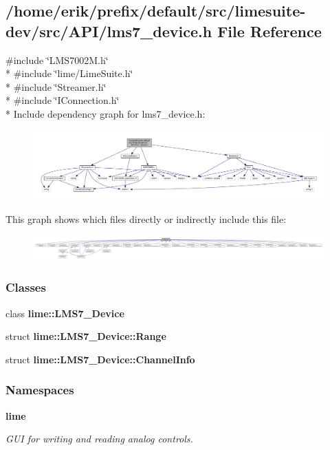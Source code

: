 \subsection{/home/erik/prefix/default/src/limesuite-\/dev/src/\+A\+P\+I/lms7\+\_\+device.h File Reference}
\label{lms7__device_8h}
{\ttfamily \#include \char`\"{}L\+M\+S7002\+M.\+h\char`\"{}}\\*
{\ttfamily \#include \char`\"{}lime/\+Lime\+Suite.\+h\char`\"{}}\\*
{\ttfamily \#include \char`\"{}Streamer.\+h\char`\"{}}\\*
{\ttfamily \#include \char`\"{}I\+Connection.\+h\char`\"{}}\\*
Include dependency graph for lms7\+\_\+device.\+h\+:
\nopagebreak
\begin{figure}[H]
\begin{center}
\leavevmode
\includegraphics[width=350pt]{d6/de3/lms7__device_8h__incl}
\end{center}
\end{figure}
This graph shows which files directly or indirectly include this file\+:
\nopagebreak
\begin{figure}[H]
\begin{center}
\leavevmode
\includegraphics[width=350pt]{d0/d32/lms7__device_8h__dep__incl}
\end{center}
\end{figure}
\subsubsection*{Classes}
\begin{DoxyCompactItemize}
\item 
class {\bf lime\+::\+L\+M\+S7\+\_\+\+Device}
\item 
struct {\bf lime\+::\+L\+M\+S7\+\_\+\+Device\+::\+Range}
\item 
struct {\bf lime\+::\+L\+M\+S7\+\_\+\+Device\+::\+Channel\+Info}
\end{DoxyCompactItemize}
\subsubsection*{Namespaces}
\begin{DoxyCompactItemize}
\item 
 {\bf lime}
\begin{DoxyCompactList}\small\item\em G\+UI for writing and reading analog controls. \end{DoxyCompactList}\end{DoxyCompactItemize}

